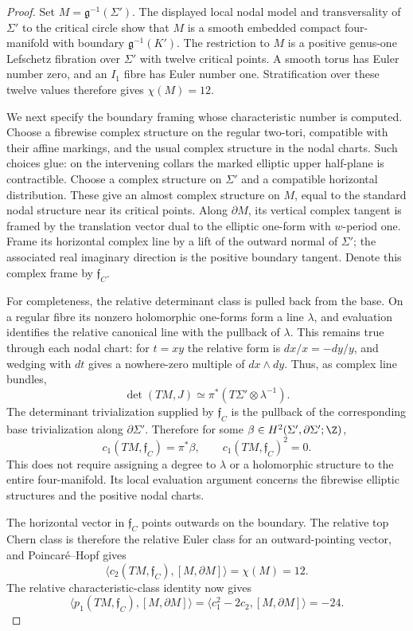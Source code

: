 \begin{proof}
Set $M=\mathfrak g^{-1}(\Sigma')$. The displayed local nodal
model and transversality of $\Sigma'$ to the critical circle
show that $M$ is a smooth embedded compact four-manifold with
boundary $\mathfrak g^{-1}(K')$. The restriction to $M$ is a
positive genus-one Lefschetz fibration over $\Sigma'$ with
twelve critical points. A smooth torus has Euler number zero,
and an $I_1$ fibre has Euler number one. Stratification over
these twelve values therefore gives $\chi(M)=12$.

We next specify the boundary framing whose characteristic number
is computed. Choose a fibrewise complex structure on the regular
two-tori, compatible with their affine markings, and the usual
complex structure in the nodal charts. Such choices glue: on
the intervening collars the marked elliptic upper half-plane
is contractible. Choose a complex structure on $\Sigma'$ and
a compatible horizontal distribution. These give an almost
complex structure on $M$, equal to the standard nodal structure
near its critical points. Along $\partial M$, its vertical
complex tangent is framed by the translation vector dual to
the elliptic one-form with $w$-period one. Frame its horizontal
complex line by a lift of the outward normal of $\Sigma'$;
the associated real imaginary direction is the positive
boundary tangent. Denote this complex frame by $\mathfrak f_C$.

For completeness, the relative determinant class is pulled
back from the base. On a regular fibre its nonzero holomorphic
one-forms form a line $\lambda$, and evaluation identifies
the relative canonical line with the pullback of $\lambda$.
This remains true through each nodal chart: for $t=xy$ the
relative form is $dx/x=-dy/y$, and wedging with $dt$ gives
a nowhere-zero multiple of $dx\wedge dy$. Thus, as complex
line bundles,
\[
 \det(TM,J)\simeq\pi^*(T\Sigma'\otimes\lambda^{-1}).
\]
The determinant trivialization supplied by $\mathfrak f_C$
is the pullback of the corresponding base trivialization along
$\partial\Sigma'$. Therefore for some
$\beta\in H^2(\Sigma',\partial\Sigma';\Z)$,
\[
 c_1(TM,\mathfrak f_C)=\pi^*\beta,
 \qquad c_1(TM,\mathfrak f_C)^2=0.
\]
This does not require assigning a degree to $\lambda$ or a
holomorphic structure to the entire four-manifold. Its local
evaluation argument concerns the fibrewise elliptic structures
and the positive nodal charts.

The horizontal vector in $\mathfrak f_C$ points outwards on
the boundary. The relative top Chern class is therefore the
relative Euler class for an outward-pointing vector, and
Poincar\'e--Hopf gives
\[
 \langle c_2(TM,\mathfrak f_C),[M,\partial M]\rangle
 =\chi(M)=12.
\]
The relative characteristic-class identity now gives
\[
 \langle p_1(TM,\mathfrak f_C),[M,\partial M]\rangle
 =\langle c_1^2-2c_2,[M,\partial M]\rangle=-24.
\]


\end{proof}
